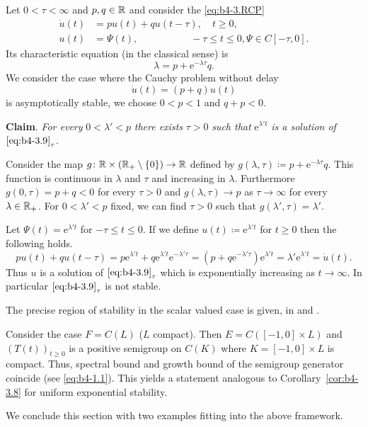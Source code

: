 Let $0 < \tau < \infty$ and $p,q \in \mathbb{R}$ and consider the \eqref{eq:b4-3.RCP}
\begin{equation}\label{eq:b4-3.9}
    \begin{aligned}
		\dot{u}(t) &= pu(t) + qu(t-\tau) , \quad t \geq 0 ,\\
		u(t) &= \Psi(t) , \quad\quad\quad\quad\quad\; -\tau \leq t \leq 0 , \Psi \in C[-\tau,0] .
	\end{aligned}
\end{equation}
Its characteristic equation (in the classical sense) is 
\begin{equation}\label{eq:b4-3.10}
 \lambda = p + \mathrm{e}^{-\lambda\tau}q .
\end{equation}
We consider the case where the Cauchy problem without delay
\[
\dot{u}(t) = (p + q)u(t)
\]
is asymptotically stable, \ie we choose $0 < p < 1$ and $q + p < 0$.

\textbf{Claim}.
	\textit{For every} $0 < \lambda' < p$ \textit{there exists} $\tau > 0$ \textit{such that} $\mathrm{e}^{\lambda't}$ \textit{is a solution of} $\eqref{eq:b4-3.9}_{\tau}$.

Consider the map $g \colon \mathbb{R}\times(\mathbb{R}_{+}\setminus\{0\}) \to \mathbb{R}$ defined by $g(\lambda,\tau) \coloneqq p + \mathrm{e}^{-\lambda\tau}q$.
This function is continuous in $\lambda$ and $\tau$ and increasing in $\lambda$.
Furthermore $g(0,\tau) = p + q < 0$ for every $\tau > 0$ and $g(\lambda,\tau) \to p$ as $\tau \to \infty$ for every $\lambda \in \mathbb{R}_{+}$.
For $0 < \lambda' < p$ fixed, we can find $\tau > 0$ such that $g(\lambda',\tau) = \lambda'$.

Let $\Psi(t) = \mathrm{e}^{\lambda't}$ for $-\tau \leq t \leq 0$. 
If we define $u(t) \coloneq \mathrm{e}^{\lambda't}$ for $t \geq 0$ then the following holds.
\[
pu(t) + qu(t-\tau) = p\mathrm{e}^{\lambda't} + q\mathrm{e}^{\lambda't}\mathrm{e}^{-\lambda'\tau} = (p+q\mathrm{e}^{-\lambda'\tau})\mathrm{e}^{\lambda't} = \lambda'\mathrm{e}^{\lambda't} = \dot{u}(t) .
\]
Thus $u$ is a solution of $\eqref{eq:b4-3.9}_{\tau}$ which is exponentially increasing as $t \to \infty$. 
In particular $\eqref{eq:b4-3.9}_{\tau}$ is not stable.

The precise region of stability in the scalar valued case is given, \eg in \citet{hadeler:1978}  and  \citet[p.107ff]{hale:1977}.


\begin{remark*}
	Consider the case $F = C(L)$ ($L$ compact).
	Then $E = C([-1,0] \times L)$ and $(T(t))_{t\geq0}$ is a positive semigroup on $C(K)$ where $K = [-1,0] \times L$ is compact. 
	Thus, spectral bound and growth bound of the semigroup generator coincide (see \eqref{eq:b4-1.1}). 
	This yields a statement analogous to Corollary~\ref{cor:b4-3.8} for uniform exponential stability.
\end{remark*}
We conclude this section with two examples fitting into the above framework.

